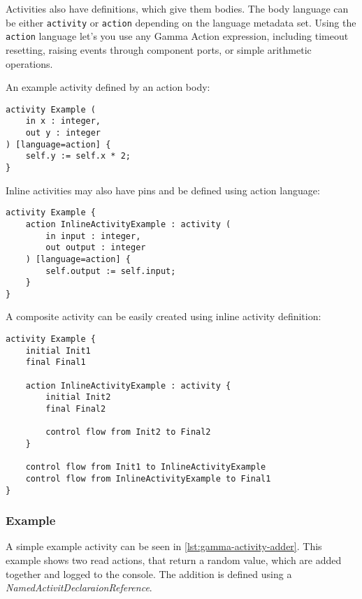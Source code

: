 Activities also have definitions, which give them bodies. The body language can be either \verb|activity| or \verb|action| depending on the language metadata set. Using the \verb|action| language let's you use any Gamma Action expression, including timeout resetting, raising events through component ports, or simple arithmetic operations.

An example activity defined by an action body:

\begin{lstlisting}[language=activity]
activity Example (
	in x : integer,
	out y : integer
) [language=action] {
	self.y := self.x * 2;
}
\end{lstlisting}

Inline activities may also have pins and be defined using action language:

\begin{lstlisting}[language=activity]
activity Example {
	action InlineActivityExample : activity (
		in input : integer,
		out output : integer
	) [language=action] {
		self.output := self.input;
	}
}
\end{lstlisting}

A composite activity can be easily created using inline activity definition:

\begin{lstlisting}[language=activity]
activity Example {
	initial Init1
	final Final1
	
	action InlineActivityExample : activity {
		initial Init2
		final Final2
		
		control flow from Init2 to Final2
	}

	control flow from Init1 to InlineActivityExample
	control flow from InlineActivityExample to Final1
}
\end{lstlisting}

\subsubsection*{Example}

A simple example activity can be seen in \autoref{lst:gamma-activity-adder}. This example shows two read actions, that return a random value, which are added together and logged to the console. The addition is defined using a \emph{NamedActivitDeclaraionReference}.


